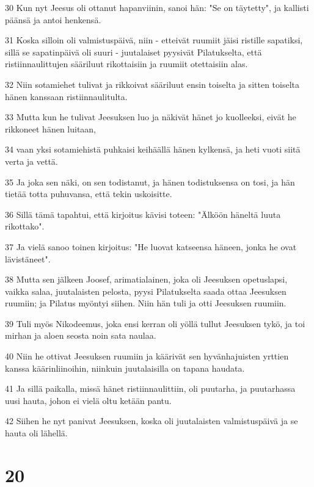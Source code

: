 \par 30 Kun nyt Jeesus oli ottanut hapanviinin, sanoi hän: "Se on täytetty", ja kallisti päänsä ja antoi henkensä.
\par 31 Koska silloin oli valmistuspäivä, niin - etteivät ruumiit jäisi ristille sapatiksi, sillä se sapatinpäivä oli suuri - juutalaiset pyysivät Pilatukselta, että ristiinnaulittujen sääriluut rikottaisiin ja ruumiit otettaisiin alas.
\par 32 Niin sotamiehet tulivat ja rikkoivat sääriluut ensin toiselta ja sitten toiselta hänen kanssaan ristiinnaulitulta.
\par 33 Mutta kun he tulivat Jeesuksen luo ja näkivät hänet jo kuolleeksi, eivät he rikkoneet hänen luitaan,
\par 34 vaan yksi sotamiehistä puhkaisi keihäällä hänen kylkensä, ja heti vuoti siitä verta ja vettä.
\par 35 Ja joka sen näki, on sen todistanut, ja hänen todistuksensa on tosi, ja hän tietää totta puhuvansa, että tekin uskoisitte.
\par 36 Sillä tämä tapahtui, että kirjoitus kävisi toteen: "Älköön häneltä luuta rikottako".
\par 37 Ja vielä sanoo toinen kirjoitus: "He luovat katseensa häneen, jonka he ovat lävistäneet".
\par 38 Mutta sen jälkeen Joosef, arimatialainen, joka oli Jeesuksen opetuslapsi, vaikka salaa, juutalaisten pelosta, pyysi Pilatukselta saada ottaa Jeesuksen ruumiin; ja Pilatus myöntyi siihen. Niin hän tuli ja otti Jeesuksen ruumiin.
\par 39 Tuli myös Nikodeemus, joka ensi kerran oli yöllä tullut Jeesuksen tykö, ja toi mirhan ja aloen seosta noin sata naulaa.
\par 40 Niin he ottivat Jeesuksen ruumiin ja käärivät sen hyvänhajuisten yrttien kanssa käärinliinoihin, niinkuin juutalaisilla on tapana haudata.
\par 41 Ja sillä paikalla, missä hänet ristiinnaulittiin, oli puutarha, ja puutarhassa uusi hauta, johon ei vielä oltu ketään pantu.
\par 42 Siihen he nyt panivat Jeesuksen, koska oli juutalaisten valmistuspäivä ja se hauta oli lähellä.

\chapter{20}

